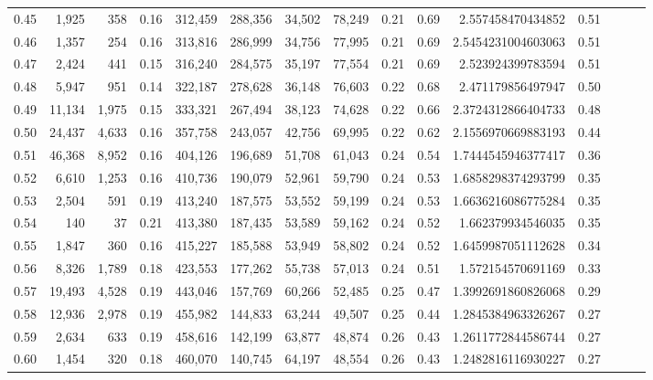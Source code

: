 \begin{tabular}{rrrrrrrrrrrrrrr}
0.45 &   1,925 &    358 &  0.16 &  312,459 &  288,356 &   34,502 &   78,249 &  0.21 &  0.69 &    2.557458470434852 &      0.51 \\
0.46 &   1,357 &    254 &  0.16 &  313,816 &  286,999 &   34,756 &   77,995 &  0.21 &  0.69 &   2.5454231004603063 &      0.51 \\
0.47 &   2,424 &    441 &  0.15 &  316,240 &  284,575 &   35,197 &   77,554 &  0.21 &  0.69 &    2.523924399783594 &      0.51 \\
0.48 &   5,947 &    951 &  0.14 &  322,187 &  278,628 &   36,148 &   76,603 &  0.22 &  0.68 &    2.471179856497947 &      0.50 \\
0.49 &  11,134 &  1,975 &  0.15 &  333,321 &  267,494 &   38,123 &   74,628 &  0.22 &  0.66 &   2.3724312866404733 &      0.48 \\
0.50 &  24,437 &  4,633 &  0.16 &  357,758 &  243,057 &   42,756 &   69,995 &  0.22 &  0.62 &   2.1556970669883193 &      0.44 \\
0.51 &  46,368 &  8,952 &  0.16 &  404,126 &  196,689 &   51,708 &   61,043 &  0.24 &  0.54 &   1.7444545946377417 &      0.36 \\
0.52 &   6,610 &  1,253 &  0.16 &  410,736 &  190,079 &   52,961 &   59,790 &  0.24 &  0.53 &   1.6858298374293799 &      0.35 \\
0.53 &   2,504 &    591 &  0.19 &  413,240 &  187,575 &   53,552 &   59,199 &  0.24 &  0.53 &   1.6636216086775284 &      0.35 \\
0.54 &     140 &     37 &  0.21 &  413,380 &  187,435 &   53,589 &   59,162 &  0.24 &  0.52 &    1.662379934546035 &      0.35 \\
0.55 &   1,847 &    360 &  0.16 &  415,227 &  185,588 &   53,949 &   58,802 &  0.24 &  0.52 &   1.6459987051112628 &      0.34 \\
0.56 &   8,326 &  1,789 &  0.18 &  423,553 &  177,262 &   55,738 &   57,013 &  0.24 &  0.51 &    1.572154570691169 &      0.33 \\
0.57 &  19,493 &  4,528 &  0.19 &  443,046 &  157,769 &   60,266 &   52,485 &  0.25 &  0.47 &   1.3992691860826068 &      0.29 \\
0.58 &  12,936 &  2,978 &  0.19 &  455,982 &  144,833 &   63,244 &   49,507 &  0.25 &  0.44 &   1.2845384963326267 &      0.27 \\
0.59 &   2,634 &    633 &  0.19 &  458,616 &  142,199 &   63,877 &   48,874 &  0.26 &  0.43 &   1.2611772844586744 &      0.27 \\
0.60 &   1,454 &    320 &  0.18 &  460,070 &  140,745 &   64,197 &   48,554 &  0.26 &  0.43 &   1.2482816116930227 &      0.27 \\

\end{tabular}
